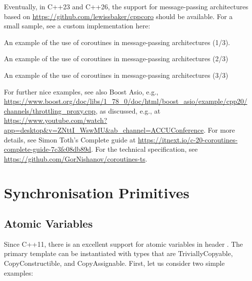 \begin{itemize}
\begin{end}
Eventually, in C++23 and C++26, the support for message-passing architectures based on \url{https://github.com/lewissbaker/cppcoro} should be available. For a small sample, see a custom implementation here:

\raggedbottom
\begin{codebox}[]{\href{https://godbolt.org/z/KhYaGPn7e}{\ExternalLink}}
\footnotesize An example of the use of coroutines in message-passing architectures (1/3).
\tcblower
{}
\end{codebox}

\raggedbottom
\begin{codebox}[]{\href{https://godbolt.org/z/5vEsW6dKE}{\ExternalLink}}
\footnotesize An example of the use of coroutines in message-passing architectures (2/3)
\tcblower
{}
\end{codebox}

\raggedbottom
\begin{codebox}[]{\href{https://godbolt.org/z/vEaM8PM9s}{\ExternalLink}}
\footnotesize An example of the use of coroutines in message-passing architectures (3/3)
\tcblower
{}
\end{codebox}

For further nice examples, see also Boost Asio, e.g.,
\url{https://www.boost.org/doc/libs/1_78_0/doc/html/boost_asio/example/cpp20/channels/throttling_proxy.cpp}, 
as discussed, e.g., at
\url{https://www.youtube.com/watch?app=desktop&v=ZNttI_WswMU&ab_channel=ACCUConference}.
For more details, see Simon Toth's Complete guide at \url{https://itnext.io/c-20-coroutines-complete-guide-7c3fc08db89d}.
For the technical specification, see \url{https://github.com/GorNishanov/coroutines-ts}.

\section{Synchronisation Primitives}

\subsection{Atomic Variables}
\label{sec:atomiccpp23}

Since C++11, there is an excellent support for atomic variables in header . 
The primary template can be instantiated with types that are TriviallyCopyable, CopyConstructible, and CopyAssignable.
First, let us consider two simple examples:


\end{end}
\end{itemize}
